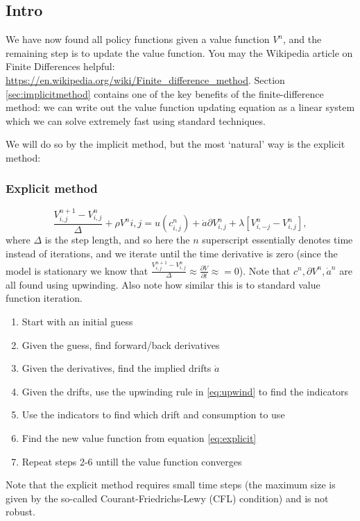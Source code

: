 \documentclass[12pt]{article}
\DeclareMathOperator{\1}{\mathbbm{1}}
\begin{document}
\subsection{Intro}
We have now found all policy functions given a value function $V^n$, and the remaining step is to update the value function. You may the Wikipedia article on Finite Differences helpful: \url{https://en.wikipedia.org/wiki/Finite_difference_method}. Section \ref{sec:implicitmethod} contains one of the key benefits of the finite-difference method: we can write out the value function updating equation as a linear system which we can solve extremely fast using standard techniques.

We will do so by the implicit method, but the most `natural' way is the explicit method:
\subsubsection{Explicit method}
\begin{equation}\label{eq:explicit}
\frac{V^{n+1}_{i,j} - V^n_{i,j}}\Delta + \rho V^n{i,j} =u(c^n_{i,j}) + \dot a \partial V^n_{i,j} + \lambda [V^n_{i,-j} - V^n_{i,j}],
\end{equation}
where $\Delta$ is the step length, and so here the $n$ superscript essentially denotes time instead of iterations, and we iterate until the time derivative is zero (since the model is stationary we know that $\frac{V^{n+1}_{i,j} - V^n_{i,j}}\Delta\approx \frac{\partial V}{\partial t}\approx =0$). Note that $c^n,\partial V^n, \dot a^n$ are all found using upwinding. Also note how similar this is to standard value function iteration.

\begin{enumerate}
\item Start with an initial guess
\item Given the guess, find forward/back derivatives
\item Given the derivatives, find the implied drifts $\dot a$
\item Given the drifts, use the upwinding rule in \eqref{eq:upwind} to find the indicators
\item Use the indicators to find which drift and consumption to use
\item Find the new value function from equation \eqref{eq:explicit}
\item Repeat steps 2-6 untill the value function converges
\end{enumerate}

Note that the explicit method requires small time steps (the maximum size is given by the  so-called Courant-Friedrichs-Lewy (CFL) condition) and is not robust.
\end{document}

